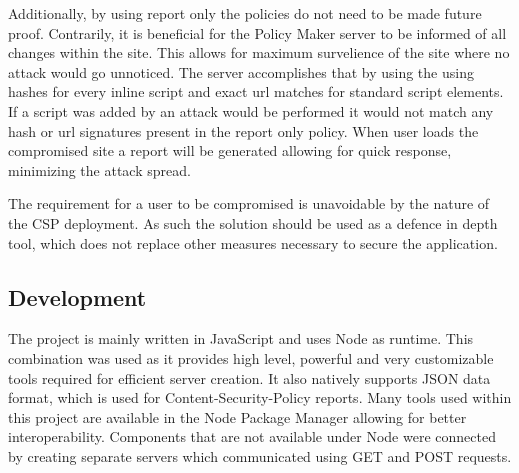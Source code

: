 Additionally, by using report only the policies do not need to be made future proof. 
Contrarily, it is beneficial for the Policy Maker server to be informed of all changes within the site.
This allows for maximum survelience of the site where no attack would go unnoticed.
The server accomplishes that by using the using hashes for every inline script and exact url matches for standard script elements.
If a script was added by an attack would be performed it would not match any hash or url signatures present in the report only policy.
When user loads the compromised site a report will be generated allowing for quick response, minimizing the attack spread.

The requirement for a user to be compromised is unavoidable by the nature of the CSP deployment.
As such the solution should be used as a defence in depth tool, which does not replace other measures necessary to secure the application.

\subsection{Development}

The project is mainly written in JavaScript and uses Node as runtime.
This combination was used as it provides high level, powerful and very customizable tools required for efficient server creation.
It also natively supports JSON data format, which is used for Content-Security-Policy reports.
Many tools used within this project are available in the Node Package Manager allowing for better interoperability.
Components that are not available under Node were connected by creating separate servers which communicated using GET and POST requests.

